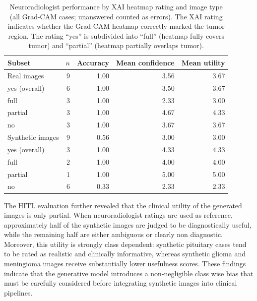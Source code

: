 \begin{table}[H]
\centering
\caption{Neuroradiologist performance by XAI heatmap rating and image type (all Grad-CAM cases; unanswered counted as errors). The XAI rating indicates whether the Grad-CAM heatmap correctly marked the tumor region. The rating ``yes'' is subdivided into ``full'' (heatmap fully covers tumor) and ``partial'' (heatmap partially overlaps tumor).}
\label{tab:hitl_xai_rating_real_fake_all_cases}
\begin{tabular}{lrrrr}
\toprule
Subset & $n$ & Accuracy & Mean confidence & Mean utility \\
\midrule
Real images           &  9 & 1.00 & 3.56 & 3.67 \\
\quad yes (overall)   &  6 & 1.00 & 3.50 & 3.67 \\
\quad\quad full       &  3 & 1.00 & 2.33 & 3.00 \\
\quad\quad partial    &  3 & 1.00 & 4.67 & 4.33 \\
\quad no              &  3 & 1.00 & 3.67 & 3.67 \\
\midrule
Synthetic images      &  9 & 0.56 & 3.00 & 3.00 \\
\quad yes (overall)   &  3 & 1.00 & 4.33 & 4.33 \\
\quad\quad full       &  2 & 1.00 & 4.00 & 4.00 \\
\quad\quad partial    &  1 & 1.00 & 5.00 & 5.00 \\
\quad no              &  6 & 0.33 & 2.33 & 2.33 \\
\bottomrule
\end{tabular}
\end{table}




The HITL evaluation further revealed that the clinical utility of the generated images is only partial. When neuroradiologist ratings are used as reference, approximately half of the synthetic images are judged to be diagnostically useful, while the remaining half are either ambiguous or clearly non diagnostic. Moreover, this utility is strongly class dependent: synthetic pituitary cases tend to be rated as realistic and clinically informative, whereas synthetic glioma and meningioma images receive substantially lower usefulness scores. These findings indicate that the generative model introduces a non-negligible class wise bias that must be carefully considered before integrating synthetic images into clinical pipelines.
